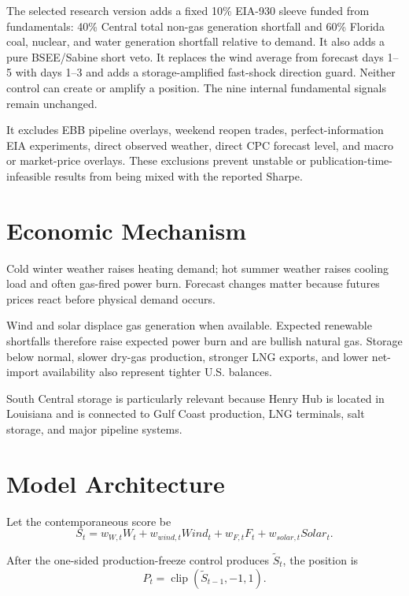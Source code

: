 \documentclass[11pt,a4paper]{article}
\begin{document}
The selected research version adds a fixed 10\% EIA-930 sleeve funded from
fundamentals: 40\% Central total non-gas generation shortfall and 60\% Florida
coal, nuclear, and water generation shortfall relative to demand. It also adds
a pure BSEE/Sabine short veto. It replaces the wind average from forecast days
1--5 with days 1--3 and adds a storage-amplified fast-shock direction guard.
Neither control can create or amplify a position. The nine internal fundamental
signals remain unchanged.

It excludes EBB pipeline overlays, weekend reopen trades, perfect-information
EIA experiments, direct observed weather, direct CPC forecast level, and macro
or market-price overlays. These exclusions prevent unstable or
publication-time-infeasible results from being mixed with the reported Sharpe.

\section{Economic Mechanism}

Cold winter weather raises heating demand; hot summer weather raises cooling
load and often gas-fired power burn. Forecast changes matter because futures
prices react before physical demand occurs.

Wind and solar displace gas generation when available. Expected renewable
shortfalls therefore raise expected power burn and are bullish natural gas.
Storage below normal, slower dry-gas production, stronger LNG exports, and
lower net-import availability also represent tighter U.S. balances.

South Central storage is particularly relevant because Henry Hub is located
in Louisiana and is connected to Gulf Coast production, LNG terminals, salt
storage, and major pipeline systems.

\section{Model Architecture}

Let the contemporaneous score be
\begin{equation}
S_t=w_{W,t}W_t+w_{wind,t}Wind_t+w_{F,t}F_t+w_{solar,t}Solar_t.
\end{equation}

After the one-sided production-freeze control produces $\widetilde S_t$, the
position is
\begin{equation}
P_t=\operatorname{clip}(\widetilde S_{t-1},-1,1).
\end{equation}
\end{document}
